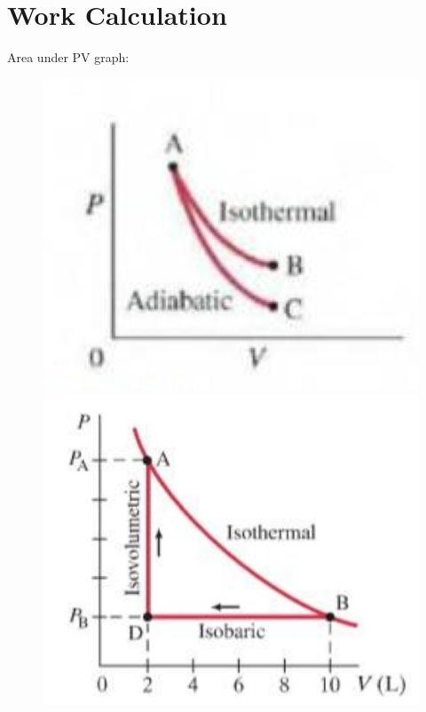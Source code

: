 \documentclass[12 pt , twoside, letterpaper] {article}
\begin{document}
	\section{Work Calculation}
	Area under PV graph:
	\begin{figure}
				\includegraphics[scale=0.5]{AdIso}
				\includegraphics[scale=0.3]{PVdiag}	
	\end{figure}
\end{document}
